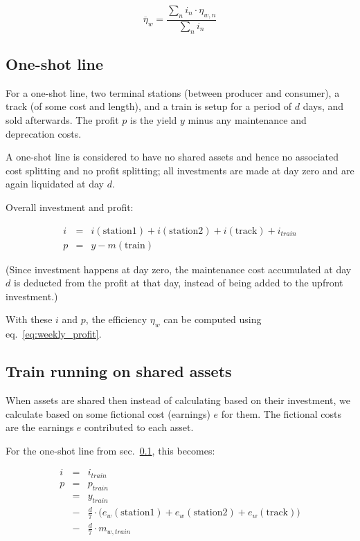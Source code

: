 \documentclass[12pt]{article}
\begin{document}
\begin{equation}
  \overline\eta_w = \frac{\sum_n i_n \cdot \eta_{w,n}}{\sum_n i_n}
\end{equation}




\subsection{One-shot line}
\label{sec:one_shot_line}

For a one-shot line, two terminal stations (between producer and consumer),
a track (of some cost and length), and a train is setup for a period of
$d$ days, and sold afterwards. The profit $p$ is the yield $y$ minus any
maintenance and deprecation costs.

A one-shot line is considered to have no shared assets and hence no associated cost splitting
and no profit splitting; all investments are made at day zero and are again liquidated at day $d$.

Overall investment and profit:

\begin{eqnarray}
  i &=& i\left(\mathrm{station1}\right)
     +  i\left(\mathrm{station2}\right)
     +  i\left(\mathrm{track}\right)
     +  i_\mathit{train} \\
  p &=& y
     -  m\left(\mathrm{train}\right)
\end{eqnarray}

(Since investment happens at day zero, the maintenance cost accumulated at day $d$ is deducted
from the profit at that day, instead of being added to the upfront investment.)

With these $i$ and $p$, the efficiency $\eta_w$ can be computed using eq.~\ref{eq:weekly_profit}.


\subsection{Train running on shared assets}

When assets are shared then instead of calculating based on their investment, we calculate based on
some fictional cost (earnings) $e$ for them. The fictional costs are the earnings $e$ contributed to each asset.

For the one-shot line from sec.~\ref{sec:one_shot_line}, this becomes:

\begin{eqnarray}
  i &=& i_\mathit{train} \\
  p &=& p_\mathit{train} \nonumber \\
    &=& y_\mathit{train} \nonumber \\
    &-& \frac{d}{7} \cdot \biggl(
          e_w\left(\mathrm{station1}\right)
       +  e_w\left(\mathrm{station2}\right)
       +  e_w\left(\mathrm{track}\right)
       \biggr) \nonumber \\
    &-& \frac{d}{7} \cdot m_{w,\mathit{train}}
\end{eqnarray}
\end{document}
